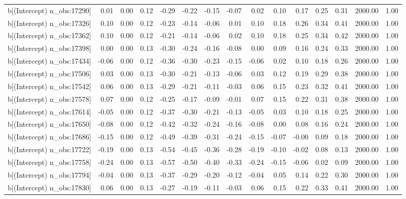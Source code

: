 \begin{table}[ht]
\begin{tabular}{rrrrrrrrrrrrrrr}
  b[(Intercept) n\_obs:17290] & 0.01 & 0.00 & 0.12 & -0.29 & -0.22 & -0.15 & -0.07 & 0.02 & 0.10 & 0.17 & 0.25 & 0.31 & 2000.00 & 1.00 \\ 
  b[(Intercept) n\_obs:17326] & 0.10 & 0.00 & 0.12 & -0.23 & -0.14 & -0.06 & 0.01 & 0.10 & 0.18 & 0.26 & 0.34 & 0.41 & 2000.00 & 1.00 \\ 
  b[(Intercept) n\_obs:17362] & 0.10 & 0.00 & 0.12 & -0.21 & -0.14 & -0.06 & 0.02 & 0.10 & 0.18 & 0.25 & 0.34 & 0.42 & 2000.00 & 1.00 \\ 
  b[(Intercept) n\_obs:17398] & 0.00 & 0.00 & 0.13 & -0.30 & -0.24 & -0.16 & -0.08 & 0.00 & 0.09 & 0.16 & 0.24 & 0.33 & 2000.00 & 1.00 \\ 
  b[(Intercept) n\_obs:17434] & -0.06 & 0.00 & 0.12 & -0.36 & -0.30 & -0.23 & -0.15 & -0.06 & 0.02 & 0.10 & 0.18 & 0.26 & 2000.00 & 1.00 \\ 
  b[(Intercept) n\_obs:17506] & 0.03 & 0.00 & 0.13 & -0.30 & -0.21 & -0.13 & -0.06 & 0.03 & 0.12 & 0.19 & 0.29 & 0.38 & 2000.00 & 1.00 \\ 
  b[(Intercept) n\_obs:17542] & 0.06 & 0.00 & 0.13 & -0.29 & -0.21 & -0.11 & -0.03 & 0.06 & 0.15 & 0.23 & 0.32 & 0.41 & 2000.00 & 1.00 \\ 
  b[(Intercept) n\_obs:17578] & 0.07 & 0.00 & 0.12 & -0.25 & -0.17 & -0.09 & -0.01 & 0.07 & 0.15 & 0.22 & 0.31 & 0.38 & 2000.00 & 1.00 \\ 
  b[(Intercept) n\_obs:17614] & -0.05 & 0.00 & 0.12 & -0.37 & -0.30 & -0.21 & -0.13 & -0.05 & 0.03 & 0.10 & 0.18 & 0.25 & 2000.00 & 1.00 \\ 
  b[(Intercept) n\_obs:17650] & -0.08 & 0.00 & 0.12 & -0.42 & -0.32 & -0.24 & -0.16 & -0.08 & 0.00 & 0.08 & 0.16 & 0.24 & 2000.00 & 1.00 \\ 
  b[(Intercept) n\_obs:17686] & -0.15 & 0.00 & 0.12 & -0.49 & -0.39 & -0.31 & -0.24 & -0.15 & -0.07 & -0.00 & 0.09 & 0.18 & 2000.00 & 1.00 \\ 
  b[(Intercept) n\_obs:17722] & -0.19 & 0.00 & 0.13 & -0.54 & -0.45 & -0.36 & -0.28 & -0.19 & -0.10 & -0.02 & 0.08 & 0.13 & 2000.00 & 1.00 \\ 
  b[(Intercept) n\_obs:17758] & -0.24 & 0.00 & 0.13 & -0.57 & -0.50 & -0.40 & -0.33 & -0.24 & -0.15 & -0.06 & 0.02 & 0.09 & 2000.00 & 1.00 \\ 
  b[(Intercept) n\_obs:17794] & -0.04 & 0.00 & 0.13 & -0.37 & -0.29 & -0.20 & -0.12 & -0.04 & 0.05 & 0.14 & 0.22 & 0.30 & 2000.00 & 1.00 \\ 
  b[(Intercept) n\_obs:17830] & 0.06 & 0.00 & 0.13 & -0.27 & -0.19 & -0.11 & -0.03 & 0.06 & 0.15 & 0.22 & 0.33 & 0.41 & 2000.00 & 1.00 \\ 

\end{tabular}
\end{table}
